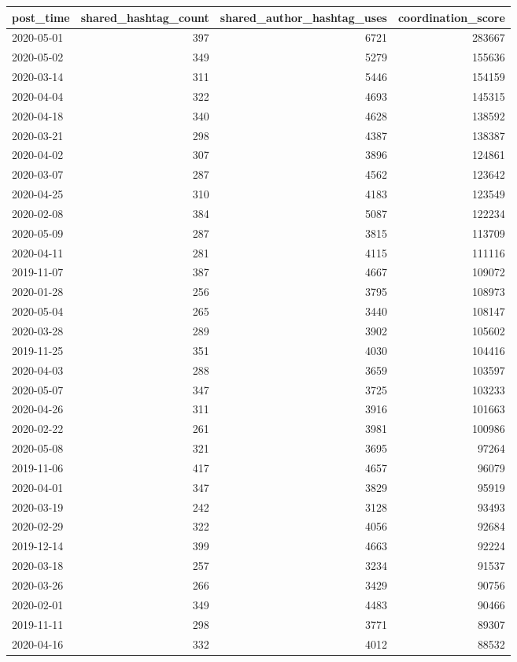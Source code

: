\begin{tabular}{lrrr}
\toprule
post\_time & shared\_hashtag\_count & shared\_author\_hashtag\_uses & coordination\_score \\
\midrule
2020-05-01 & 397 & 6721 & 283667 \\
2020-05-02 & 349 & 5279 & 155636 \\
2020-03-14 & 311 & 5446 & 154159 \\
2020-04-04 & 322 & 4693 & 145315 \\
2020-04-18 & 340 & 4628 & 138592 \\
2020-03-21 & 298 & 4387 & 138387 \\
2020-04-02 & 307 & 3896 & 124861 \\
2020-03-07 & 287 & 4562 & 123642 \\
2020-04-25 & 310 & 4183 & 123549 \\
2020-02-08 & 384 & 5087 & 122234 \\
2020-05-09 & 287 & 3815 & 113709 \\
2020-04-11 & 281 & 4115 & 111116 \\
2019-11-07 & 387 & 4667 & 109072 \\
2020-01-28 & 256 & 3795 & 108973 \\
2020-05-04 & 265 & 3440 & 108147 \\
2020-03-28 & 289 & 3902 & 105602 \\
2019-11-25 & 351 & 4030 & 104416 \\
2020-04-03 & 288 & 3659 & 103597 \\
2020-05-07 & 347 & 3725 & 103233 \\
2020-04-26 & 311 & 3916 & 101663 \\
2020-02-22 & 261 & 3981 & 100986 \\
2020-05-08 & 321 & 3695 & 97264 \\
2019-11-06 & 417 & 4657 & 96079 \\
2020-04-01 & 347 & 3829 & 95919 \\
2020-03-19 & 242 & 3128 & 93493 \\
2020-02-29 & 322 & 4056 & 92684 \\
2019-12-14 & 399 & 4663 & 92224 \\
2020-03-18 & 257 & 3234 & 91537 \\
2020-03-26 & 266 & 3429 & 90756 \\
2020-02-01 & 349 & 4483 & 90466 \\
2019-11-11 & 298 & 3771 & 89307 \\
2020-04-16 & 332 & 4012 & 88532 \\

\end{tabular}
